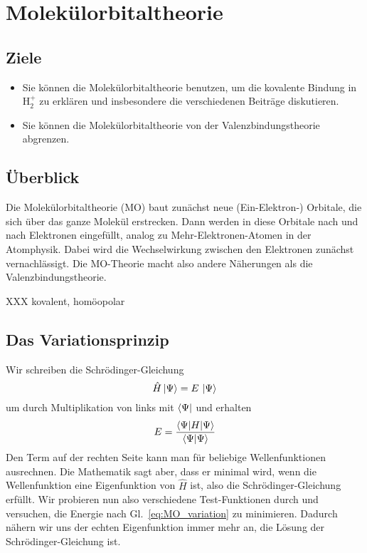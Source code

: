 
\chapter{Molekülorbitaltheorie}




\section{Ziele}

\begin{itemize}
\item Sie können die Molekülorbitaltheorie benutzen, um die kovalente Bindung in H$_2^+$ zu erklären und insbesondere die verschiedenen Beiträge  diskutieren.

\item Sie können die Molekülorbitaltheorie von der Valenzbindungstheorie abgrenzen.


\end{itemize}

\section{Überblick}

Die Molekülorbitaltheorie  (MO) baut zunächst neue (Ein-Elektron-) Orbitale, die sich über das ganze Molekül erstrecken. Dann werden in diese Orbitale nach und nach Elektronen eingefüllt, analog zu Mehr-Elektronen-Atomen in der Atomphysik. Dabei wird die Wechselwirkung zwischen den Elektronen zunächst vernachlässigt. Die MO-Theorie macht also andere Näherungen als die Valenzbindungstheorie.

 XXX kovalent, homöopolar
 
 
\section{Das Variationsprinzip}

 
Wir schreiben die Schrödinger-Gleichung
\begin{equation}
 \hat{H} \ket{\Psi} = E \, \ket{\Psi} 
\end{equation}
um durch Multiplikation von links mit $\bra{\Psi}$ und erhalten
\begin{equation}
 E = \frac{\braket{\Psi | H | \Psi}} {\braket{\Psi | \Psi}}
 \label{eq:MO_variation}
\end{equation}
Den Term auf der rechten Seite kann man für beliebige Wellenfunktionen ausrechnen. Die Mathematik sagt aber, dass er minimal wird, wenn die Wellenfunktion eine Eigenfunktion von $\hat{H}$ ist, also die Schrödinger-Gleichung erfüllt. Wir probieren nun also verschiedene Test-Funktionen durch und versuchen, die Energie nach Gl.~\ref{eq:MO_variation} zu minimieren. Dadurch nähern wir uns der echten Eigenfunktion immer mehr an, die Lösung der Schrödinger-Gleichung ist.

